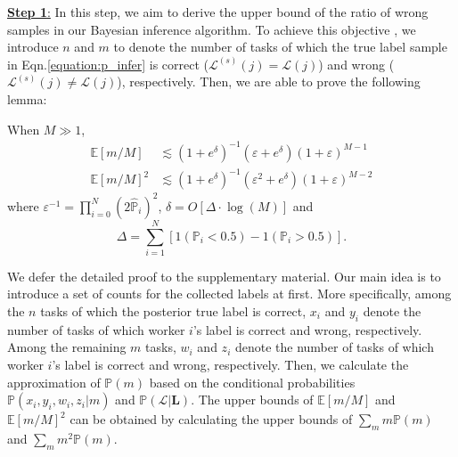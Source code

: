 \underline{\textbf{Step 1}:} In this step, we aim to derive the upper bound of the ratio of wrong samples in our Bayesian inference algorithm.
To achieve this objective , we introduce $n$ and $m$ to denote the number of tasks of which the true label sample in Eqn.\ref{equation:p_infer} is correct ($\mathcal{L}^{(s)}(j)=\mathcal{L}(j)$) and wrong ($\mathcal{L}^{(s)}(j)\neq \mathcal{L}(j)$), respectively.
Then, we are able to prove the following lemma:
\begin{lemma}
\label{ConvBound}
When $M\gg 1$,
\begin{align}
\mathbb{E}[m/M]&\lesssim (1+e^{\delta})^{-1}(\varepsilon+e^{\delta})(1+\varepsilon)^{M-1}\label{equation:CB1}\\
\mathbb{E}[m/M]^2&\lesssim (1+e^{\delta})^{-1}(\varepsilon^2+e^{\delta})(1+\varepsilon)^{M-2}\label{equation:CB2}
\end{align}
where $\varepsilon^{-1}=\prod_{i=0}^{N}(2\hat{\mathbb{P}}_i)^{2}$, $\delta=O[\Delta\cdot \log(M)]$ and 
$$\Delta={\sum}_{i=1}^N[1(\mathbb{P}_i<0.5)-1(\mathbb{P}_i>0.5)].$$
\end{lemma}
We defer the detailed proof to the supplementary material. Our main idea is to introduce a set of counts for the collected labels at first.
More specifically, among the $n$ tasks of which the posterior true label is correct, $x_i$ and $y_i$ denote the number of tasks of which worker $i$'s label is correct and wrong, respectively.
Among the remaining $m$ tasks, $w_i$ and $z_i$ denote the number of tasks of which worker $i$'s label is correct and wrong, respectively.
Then, we calculate the approximation of $\mathbb{P}(m)$ based on the conditional probabilities $\mathbb{P}(x_i,y_i,w_i, z_i|m)$ and $\mathbb{P}(\mathcal{L}|\bm{L})$.
The upper bounds of $\mathbb{E}[m/M]$ and $\mathbb{E}[m/M]^2$ can be obtained by calculating the upper bounds of $\sum_{m}m \mathbb{P}(m)$ and $\sum_{m} m^2 \mathbb{P}(m)$.

